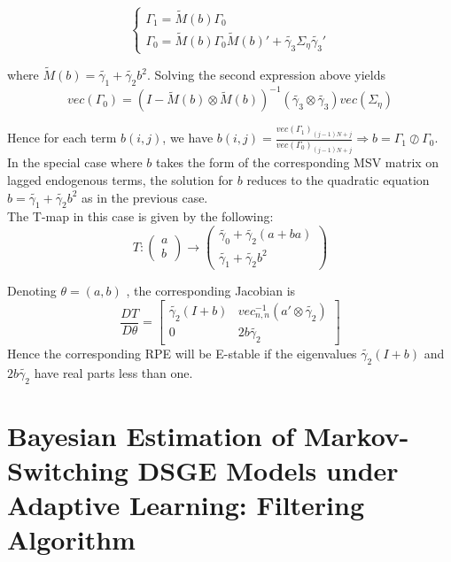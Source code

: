 \documentclass[12pt,reqno]{article}
\numberwithin{equation}{section}
\begin{document}
$$
\begin{cases}
\Gamma_1 = \tilde{M}(b) \Gamma_0 \\
\Gamma_0 = \tilde{M}(b) \Gamma_0 \tilde{M}(b)' + \tilde{\gamma_3}\Sigma_{\eta} \tilde{\gamma_3}' 
\end{cases}
$$

where $\tilde{M}(b) = \tilde{\gamma_1} + \tilde{\gamma_2} b^2$. Solving the second expression above yields 
$$ vec(\Gamma_0) = (I- \tilde{M}(b) \otimes \tilde{M}(b))^{-1} (\tilde{\gamma_3} \otimes \tilde{\gamma_3}) vec(\Sigma_{\eta}) $$

Hence for each term $b(i,j) $, we have $ b(i,j) = \frac{vec(\Gamma_1)_{(j-1)N+j}}{vec(\Gamma_0)_{(j-1)N+j}} \Rightarrow b = \Gamma_1 \oslash \Gamma_0 $. \\

In the special case where $ b $ takes the form of the corresponding MSV matrix on lagged endogenous terms, the solution for $ b $ reduces to the quadratic equation $ b = \tilde{\gamma_1 } + \tilde{\gamma_2 } b^2 $ as in the previous case. \\

The T-map in this case is given by the following: \\

$$
T: \begin{pmatrix} a \\ b \end{pmatrix}  \rightarrow \begin{pmatrix} \tilde{\gamma_0} + \tilde{\gamma_2} (a+ba) \\ \tilde{\gamma_1} + \tilde{\gamma_2} b^2 \end{pmatrix} 
$$

Denoting $ \theta = (a,b) $ , the corresponding Jacobian is \\

$$
\frac{DT}{ D \theta} = \begin{bmatrix}  \tilde{\gamma_2 } (I+b) & vec^{-1}_{n,n} ( a' \otimes \tilde{\gamma_2}) \\ 0 & 2 b \tilde{\gamma_2}  \end{bmatrix} 
$$
Hence the corresponding RPE will be E-stable if the eigenvalues $\tilde{\gamma_2} (I+b) $ and $ 2 b \tilde{\gamma_2} $ have real parts less than one. \\

\section*{Bayesian Estimation of Markov-Switching DSGE Models under Adaptive Learning: Filtering Algorithm }
\end{document}
